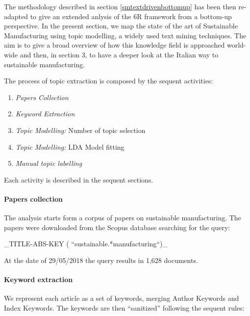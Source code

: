 \documentclass[]{book}
\providecommand{\tightlist}{%
  \setlength{\itemsep}{0pt}\setlength{\parskip}{0pt}}
\let\oldparagraph\paragraph
\renewcommand{\paragraph}[1]{\oldparagraph{#1}\mbox{}}
\begin{document}
The methodology described in section \ref{smtextdrivenbottomup} has been
then re-adapted to give an extended anlysis of the 6R framework from a
bottom-up perspective. In the present section, we map the state of the
art of Sustainable Manufacturing using topic modelling, a widely used
text mining techniques. The aim is to give a broad overview of how this
knowledge field is approached world-wide and then, in section 3, to have
a deeper look at the Italian way to sustainable manufacturing.

The process of topic extraction is composed by the sequent activities:

\begin{enumerate}
\def\labelenumi{\arabic{enumi}.}
\tightlist
\item
  \emph{Papers Collection}
\item
  \emph{Keyword Extraction}
\item
  \emph{Topic Modelling:} Number of topic selection
\item
  \emph{Topic Modelling:} LDA Model fitting
\item
  \emph{Manual topic labelling}
\end{enumerate}

Each activity is described in the sequent sections.

\paragraph{Papers collection}\label{papers-collection}

The analysis starts form a corpus of papers on sustainable
manufacturing. The papers were downloaded from the Scopus database
searching for the query:

\_TITLE-ABS-KEY ( ``sustainable.*manufacturing``)\_

At the date of 29/05/2018 the query results in 1,628 documents.

\paragraph{Keyword extraction}\label{keyword-extraction}

We represent each article as a set of keywords, merging Author Keywords
and Index Keywords. The keywords are then ``sanitized'' following the
sequent rules:
\end{document}
